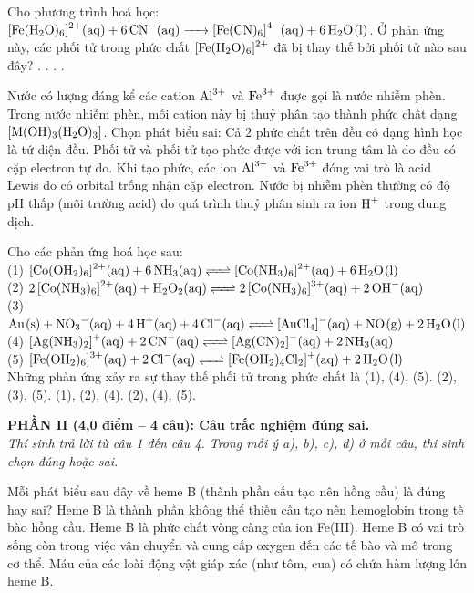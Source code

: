 \documentclass[11pt,a4paper]{article}
\def\loigiai#1{}
\begin{document}
\begin{ex}
Cho phương trình hoá học: $\ce{[Fe(H2O)6]^2+(aq) + 6CN-(aq) -> [Fe(CN)6]^4-(aq) + 6H2O(l)}$. Ở phản ứng này, các phối tử  trong phức chất $\ce{[Fe(H2O)6]^2+}$ đã bị thay thế bởi phối tử nào sau đây?
\choice
{.}
{.}
{.}
{.}
\loigiai{}
\end{ex}

\begin{ex}
Nước có lượng đáng kể các cation $\ce{Al^3+}$ và $\ce{Fe^3+}$ được gọi là nước nhiễm phèn. Trong nước nhiễm phèn, mỗi cation này bị thuỷ phân tạo thành phức chất dạng $\ce{[M(OH)3(H2O)3]}$. Chọn phát biểu sai:
\choice
{Cả 2 phức chất trên đều có dạng hình học là tứ diện đều.}
{Phối tử  và phối tử  tạo phức được với ion trung tâm là do đều có cặp electron tự do.}
{Khi tạo phức, các ion $\ce{Al^3+}$ và $\ce{Fe^3+}$ đóng vai trò là acid Lewis do có orbital trống nhận cặp electron.}
{Nước bị nhiễm phèn thường có độ pH thấp (môi trường acid) do quá trình thuỷ phân sinh ra ion $\ce{H+}$ trong dung dịch.}
\loigiai{}
\end{ex}

\begin{ex}
Cho các phản ứng hoá học sau:\\
(1) $\ce{[Co(OH2)6]^2+(aq) + 6NH3(aq) <=> [Co(NH3)6]^2+(aq) + 6H2O(l)}$\\
(2) $\ce{2[Co(NH3)6]^2+(aq) + H2O2(aq) <=> 2[Co(NH3)6]^3+(aq) + 2OH-(aq)}$\\
(3) $\ce{Au(s) + NO3-(aq) + 4H+(aq) + 4Cl-(aq) <=> [AuCl4]-(aq) + NO(g) + 2H2O(l)}$\\
(4) $\ce{[Ag(NH3)2]+(aq) + 2CN-(aq) <=> [Ag(CN)2]-(aq) + 2NH3(aq)}$\\
(5) $\ce{[Fe(OH2)6]^3+(aq) + 2Cl-(aq) <=> [Fe(OH2)4Cl2]+(aq) + 2H2O(l)}$\\
Những phản ứng xảy ra sự thay thế phối tử trong phức chất là
\choice
{(1), (4), (5).}
{(2), (3), (5).}
{(1), (2), (4).}
{(2), (4), (5).}
\loigiai{}
\end{ex}

\newpage

\noindent
\textbf{PHẦN II (4,0 điểm -- 4 câu): Câu trắc nghiệm đúng sai.}\\
\textit{Thí sinh trả lời từ câu 1 đến câu 4. Trong mỗi ý a), b), c), d) ở mỗi câu, thí sinh chọn đúng hoặc sai.}

\setcounter{ex}{0}

\begin{ex}
Mỗi phát biểu sau đây về heme B (thành phần cấu tạo nên hồng cầu) là đúng hay sai?
\choiceTF
{Heme B là thành phần không thể thiếu cấu tạo nên hemoglobin trong tế bào hồng cầu.}
{Heme B là phức chất vòng càng của ion Fe(III).}
{Heme B có vai trò sống còn trong việc vận chuyển và cung cấp oxygen đến các tế bào và mô trong cơ thể.}
{Máu của các loài động vật giáp xác (như tôm, cua) có chứa hàm lượng lớn heme B.}
\loigiai{}
\end{ex}
\end{document}
